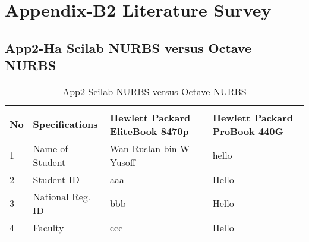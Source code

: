 \clearpage
\pagebreak
\justifying
\renewcommand{\thesection}{B \arabic{section}}

\titleformat{\section}{\normalfont\LARGE\bfseries\color{black}}{\thesection}{10pt}{\LARGE}
\section{Appendix-B2 Literature Survey}\label{sec:App2-Literature-Survey}

\clearpage
\begin{landscape}
\subsection{App2-Ha Scilab NURBS versus Octave NURBS}
	
	\begin{table}[ht]
		\begin{center}
			\caption{App2-Scilab NURBS versus Octave NURBS}		
			\label{table:App2-Scilab NURBS versus Octave NURBS}	
			
			\begin{tabular}{ |p{0.5cm}|p{5.0cm}|p{9.0cm}|p{9.0cm}|}
				\rowcolor{gray!10}			
				\hline \multicolumn{4}{|c|}{\textbf{Scilab NURBS versus Octave NURBS}} \\ [1.0ex]
				\rowcolor{gray!10}
				\hline \textbf{No} & \textbf{Specifications}    & \textbf{Hewlett Packard EliteBook 8470p} & \textbf{Hewlett Packard ProBook 440G}\\ 
				
				\hline 1 & Name of Student    & Wan Ruslan bin W Yusoff & hello\\ 
				\hline 2 & Student ID         &  aaa & Hello\\ 
				\hline 3 & National Reg. ID   & bbb  & Hello\\ 
				\hline 4 & Faculty            & ccc  & Hello\\ 
				
				\hline
			\end{tabular}
		\end{center}
	\end{table}  
	
	
\end{landscape}
